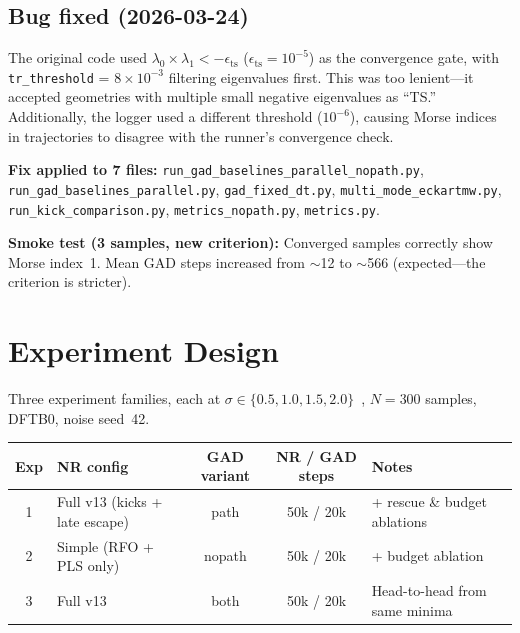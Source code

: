 \documentclass[11pt,a4paper]{article}
\newcommand{\eval}{\lambda}
\newcommand{\angstrom}{\text{\r{A}}}
\begin{document}
\subsection{Bug fixed (2026-03-24)}

The original code used $\eval_0 \times \eval_1 < -\epsilon_\text{ts}$
($\epsilon_\text{ts} = 10^{-5}$) as the convergence gate, with
\texttt{tr\_threshold} = $8 \times 10^{-3}$ filtering eigenvalues first.
This was too lenient---it accepted geometries with multiple small negative
eigenvalues as ``TS.''  Additionally, the logger used a different threshold
($10^{-6}$), causing Morse indices in trajectories to disagree with the
runner's convergence check.

\textbf{Fix applied to 7 files:}
\texttt{run\_gad\_baselines\_parallel\_nopath.py},
\texttt{run\_gad\_baselines\_parallel.py},
\texttt{gad\_fixed\_dt.py},
\texttt{multi\_mode\_eckartmw.py},
\texttt{run\_kick\_comparison.py},
\texttt{metrics\_nopath.py},
\texttt{metrics.py}.

\textbf{Smoke test (3 samples, new criterion):} Converged samples correctly
show Morse index~1.  Mean GAD steps increased from $\sim$12 to $\sim$566
(expected---the criterion is stricter).

\section{Experiment Design}
\label{app:design}

Three experiment families, each at $\sigma \in \{0.5, 1.0, 1.5, 2.0\}$~\angstrom,
$N = 300$ samples, DFTB0, noise seed~42.

\begin{center}
\begin{tabular}{clccl}
\toprule
Exp & NR config & GAD variant & NR / GAD steps & Notes \\
\midrule
1 & Full v13 (kicks + late escape) & path   & 50k / 20k & + rescue \& budget ablations \\
2 & Simple (RFO + PLS only)        & nopath & 50k / 20k & + budget ablation \\
3 & Full v13                       & both   & 50k / 20k & Head-to-head from same minima \\
\bottomrule
\end{tabular}
\end{center}

\end{document}
